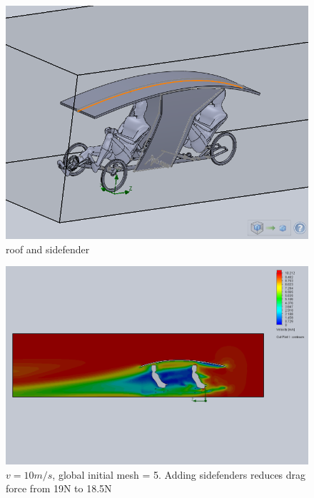 \documentclass[11pt]{article}
\begin{document}
\begin{figure}[ht]
  \includegraphics[width=\textwidth]{roof1_sidefender.png}
  \caption{roof and sidefender}
\end{figure}

\begin{figure}[ht]
\includegraphics[width=\textwidth]{gm_5_rf_7_v10_roof1_sidefender.png}
\caption{$v = 10 m/s$, global initial mesh = 5. Adding sidefenders reduces drag force from 19N to 18.5N}
\end{figure}
\end{document}
